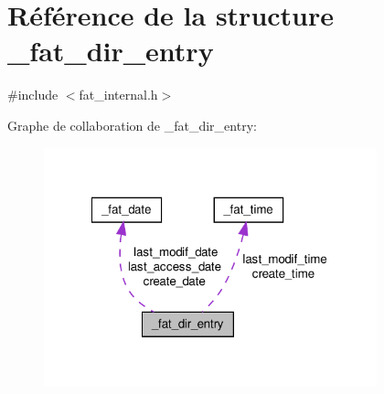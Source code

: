\hypertarget{struct__fat__dir__entry}{\section{\-Référence de la structure \-\_\-fat\-\_\-dir\-\_\-entry}
\label{struct__fat__dir__entry}
}


{\ttfamily \#include $<$fat\-\_\-internal.\-h$>$}



\-Graphe de collaboration de \-\_\-fat\-\_\-dir\-\_\-entry\-:\nopagebreak
\begin{figure}[H]
\begin{center}
\leavevmode
\includegraphics[width=273pt]{struct__fat__dir__entry__coll__graph}
\end{center}
\end{figure}
